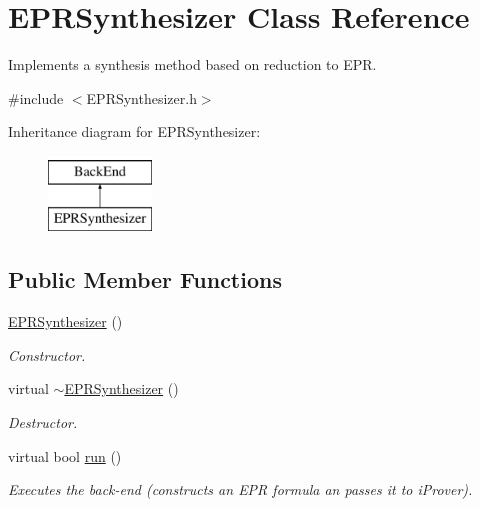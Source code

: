 \hypertarget{classEPRSynthesizer}{\section{E\-P\-R\-Synthesizer Class Reference}
\label{classEPRSynthesizer}
}


Implements a synthesis method based on reduction to E\-P\-R.  




{\ttfamily \#include $<$E\-P\-R\-Synthesizer.\-h$>$}

Inheritance diagram for E\-P\-R\-Synthesizer\-:\begin{figure}[H]
\begin{center}
\leavevmode
\includegraphics[height=2.000000cm]{classEPRSynthesizer}
\end{center}
\end{figure}
\subsection*{Public Member Functions}
\begin{DoxyCompactItemize}
\item 
\hyperlink{classEPRSynthesizer_a9798c774af30ce7f82564386f6f32d33}{E\-P\-R\-Synthesizer} ()
\begin{DoxyCompactList}\small\item\em Constructor. \end{DoxyCompactList}\item 
virtual \hyperlink{classEPRSynthesizer_a0299d7f7b8dcc26c13ab0b6268e9f974}{$\sim$\-E\-P\-R\-Synthesizer} ()
\begin{DoxyCompactList}\small\item\em Destructor. \end{DoxyCompactList}\item 
virtual bool \hyperlink{classEPRSynthesizer_ab5eb613a7e5e4f8d408938531f745e4e}{run} ()
\begin{DoxyCompactList}\small\item\em Executes the back-\/end (constructs an E\-P\-R formula an passes it to i\-Prover). \end{DoxyCompactList}\end{DoxyCompactItemize}
